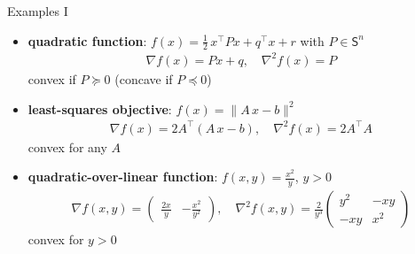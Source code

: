 \documentclass[10pt]{beamer}
\newcommand{\ds}{\displaystyle}
\theoremstyle{definition}
\begin{document}
\begin{frame}{Examples I}
  \begin{itemize}
    \item {\bf quadratic function}: $\ds f(x) = \frac{1}{2}\,x^\top P x + q^\top x + r$ with $P\in\mathsf{S}^n$ 
      \begin{align*}
        \nabla f(x) = P x + q,\quad \nabla^2 f(x) = P
      \end{align*}
      convex if $P\succcurlyeq 0$ (concave if $P\preccurlyeq 0$)
    \item {\bf least-squares objective}: $\ds f(x) = \|A\,x - b\|^2$ 
      \begin{align*}
        \nabla f(x) = 2A^\top(A\,x - b),\quad \nabla^2 f(x) = 2 A^\top A 
      \end{align*}
      convex for any $A$
    \item {\bf quadratic-over-linear function}: $\ds f(x, y) = \frac{x^2}{y}$, $y > 0$ 
      \begin{align*}
        \nabla f(x, y) = \begin{pmatrix}\frac{2x}{y} & -\frac{x^2}{y^2}\end{pmatrix},\quad \nabla^2 f(x, y) = \frac{2}{y^3}\begin{pmatrix}y^2 & -xy \\ -xy & x^2 \end{pmatrix}
      \end{align*}
      convex for $y > 0$
  \end{itemize}
\end{frame}
\end{document}
